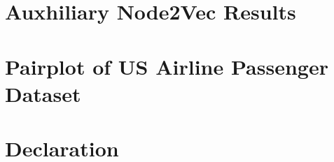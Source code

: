 \documentclass[12pt]{report}
\begin{document}
  \chapter{Auxhiliary Node2Vec Results}
  \label{app:n2v5}
  
  \newpage

  \chapter{Pairplot of US Airline Passenger Dataset}
  \label{App:pairplot}
  
  \newpage

  \chapter*{Declaration}
  
\end{document}
